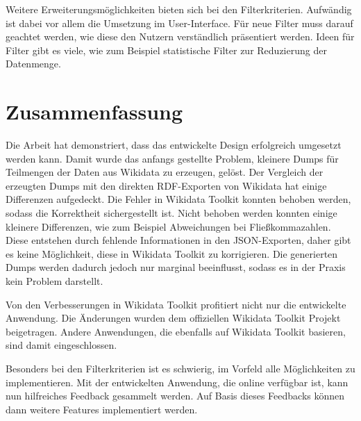 Weitere Erweiterungsmöglichkeiten bieten sich bei den Filterkriterien. 
Aufwändig ist dabei vor allem die Umsetzung im User-Interface.
Für neue Filter muss darauf geachtet werden, wie diese den Nutzern verständlich präsentiert werden.
Ideen für Filter gibt es viele, wie zum Beispiel statistische Filter zur Reduzierung der Datenmenge.

\section{Zusammenfassung}
Die Arbeit hat demonstriert, dass das entwickelte Design erfolgreich umgesetzt werden kann.
Damit wurde das anfangs gestellte Problem, kleinere Dumps für Teilmengen der Daten aus Wikidata zu erzeugen, gelöst.
Der Vergleich der erzeugten Dumps mit den direkten RDF-Exporten von Wikidata hat einige Differenzen aufgedeckt.
Die Fehler in Wikidata Toolkit konnten behoben werden, sodass die Korrektheit sichergestellt ist.
Nicht behoben werden konnten einige kleinere Differenzen, wie zum Beispiel Abweichungen bei Fließkommazahlen.
Diese entstehen durch fehlende Informationen in den JSON-Exporten, daher gibt es keine Möglichkeit, diese in Wikidata Toolkit zu korrigieren.
Die generierten Dumps werden dadurch jedoch nur marginal beeinflusst, sodass es in der Praxis kein Problem darstellt.

Von den Verbesserungen in Wikidata Toolkit profitiert nicht nur die entwickelte Anwendung.
Die Änderungen wurden dem offiziellen Wikidata Toolkit Projekt beigetragen.
Andere Anwendungen, die ebenfalls auf Wikidata Toolkit basieren, sind damit eingeschlossen.

Besonders bei den Filterkriterien ist es schwierig, im Vorfeld alle Möglichkeiten zu implementieren.
Mit der entwickelten Anwendung, die online verfügbar ist, kann nun hilfreiches Feedback gesammelt werden.
Auf Basis dieses Feedbacks können dann weitere Features implementiert werden.




